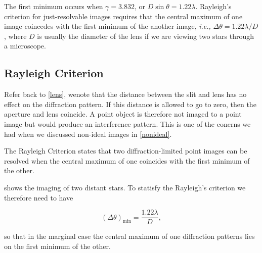 \documentclass[english,a4paper,12pt]{report}
\begin{document}

The first minimum occurs when \(\gamma = 3.832\), or \(D \sin \theta = 1.22 \lambda\). Rayleigh's criterion for just-resolvable images requires that the central maximum of one image coincedes with the first minimum of the another image, \textit{i.e.,} \(\Delta \theta = 1.22 \lambda /D\), where \(D\) is usually the diameter of the lens if we are viewing two stars through a microscope.   

\subsection{Rayleigh Criterion}

Refer back to \cref{lens}, wenote that the distance between the slit and lens has no effect on the diffraction pattern. If this distance is allowed to go to zero, then the aperture and lens coincide. A point object is therefore not imaged to a point image but would produce an interference pattern. This is one of the conerns we had when we discussed non-ideal images in \cref{nonideal}. 

The Rayleigh Criterion states that two diffraction-limited point images can be resolved when the central maximum of one coincides with the first minimum of the other.

 shows the imaging of two distant stars. To statisfy the Rayleigh's criterion we therefore need to have 

\begin{equation}
    (\Delta \theta )_{\text{min} }  = \frac{1.22 \lambda }{D},
\end{equation}

so that in the marginal case the central maximum of one diffraction patterns lies on the first minimum of the other.

\end{document}
